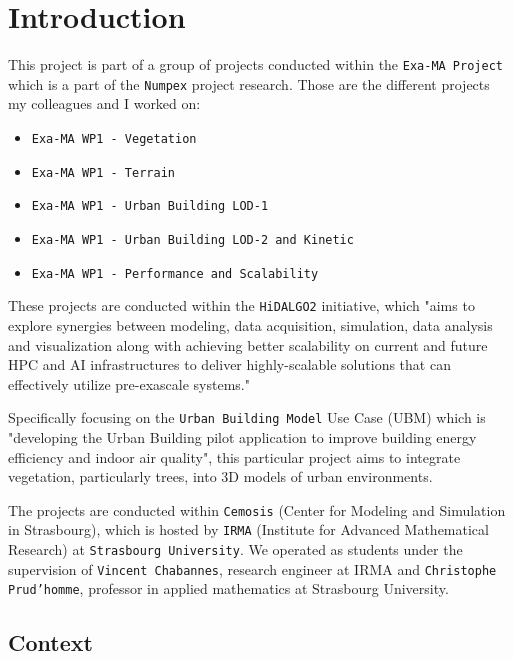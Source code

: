 \documentclass[12pt]{article}
\begin{document}
\tableofcontents

\newpage

\section{Introduction}

This project is part of a group of projects conducted within the \texttt{Exa-MA Project}
\cite{exaMA} which is a part of the \texttt{Numpex} project research\cite{numpex}. 
Those are the different projects my colleagues and I worked on:
\begin{itemize}
    \item \texttt{Exa-MA WP1 - Vegetation}
    \item \texttt{Exa-MA WP1 - Terrain}
    \item \texttt{Exa-MA WP1 - Urban Building LOD-1}
    \item \texttt{Exa-MA WP1 - Urban Building LOD-2 and Kinetic}
    \item \texttt{Exa-MA WP1 - Performance and Scalability}
\end{itemize}

These projects are conducted within the \texttt{HiDALGO2}\cite{hidalgo2} initiative, which
"aims to explore synergies between modeling, data acquisition, simulation,
data analysis and visualization along with achieving better scalability on
current and future HPC and AI infrastructures to deliver highly-scalable
solutions that can effectively utilize pre-exascale systems."\cite{hidalgo2-about}

Specifically focusing on the \texttt{Urban Building Model}\cite{hidalgo2-ubm}
Use Case (UBM) which is "developing the Urban Building pilot application to
improve building energy efficiency and indoor air quality"\cite{hidalgo2-ubm},
this particular project aims to integrate vegetation, particularly trees, into 3D models
of urban environments.

The projects are conducted within \texttt{Cemosis}\cite{cemosis} (Center for
Modeling and Simulation in Strasbourg), which is hosted by
\texttt{IRMA}\cite{irma} (Institute for Advanced Mathematical Research) at
\texttt{Strasbourg University}. We operated as students under the supervision of
 \texttt{Vincent Chabannes}\cite{chabannes}, research engineer at IRMA and 
 \texttt{Christophe Prud'homme}\cite{prudhomme}, professor in applied mathematics
  at Strasbourg University.

\subsection{Context}
\end{document}
